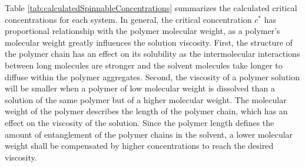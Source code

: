 Table \ref{tab:calculatedSpinnableConcentrations} summarizes the calculated critical concentrations for each system. In general, the critical concentration $c^*$ has proportional relationship with the polymer molecular weight, as a polymer's molecular weight greatly influences the solution viscosity. First, the structure of the polymer chain has an effect on its solubility as the intermolecular interactions between long molecules are stronger and the solvent molecules take longer to diffuse within the polymer aggregates. \cite{Ramakrishna2005, Floreshernandez2020} Second, the viscosity of a polymer solution will be smaller when a polymer of low molecular weight is dissolved than a solution of the same polymer but of a higher molecular weight. \cite{Ramakrishna2005} The molecular weight of the polymer describes the length of the polymer chain, which has an effect on the viscosity of the solution. Since the polymer length defines the amount of entanglement of the polymer chains in the solvent, a lower molecular weight shall be compensated by higher concentrations to reach the desired viscosity.